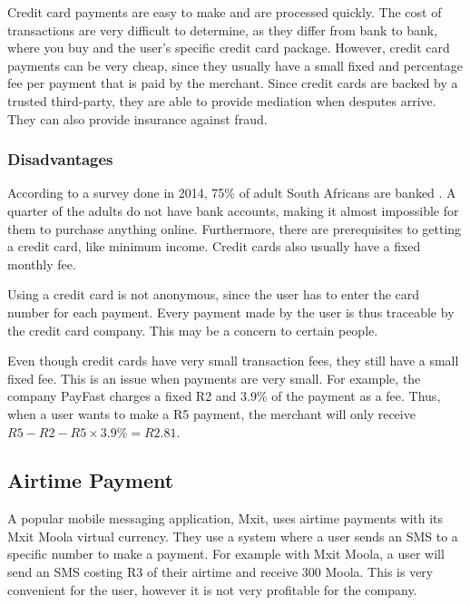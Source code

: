 Credit card payments are easy to make and are processed quickly. The cost of transactions are very difficult to determine, as they differ from bank to bank, where you buy and the user's specific credit card package. However, credit card payments can be very cheap, since they usually have a small fixed and percentage fee per payment that is paid by the merchant. Since credit cards are backed by a trusted third-party, they are able to provide mediation when desputes arrive. They can also provide insurance against fraud. 

\subsubsection{Disadvantages}

According to a survey done in 2014, 75\% of adult South Africans are banked \cite{finmark}. A quarter of the adults do not have bank accounts, making it almost impossible for them to purchase anything online. Furthermore, there are prerequisites to getting a credit card, like minimum income. Credit cards also usually have a fixed monthly fee.

Using a credit card is not anonymous, since the user has to enter the card number for each payment. Every payment made by the user is thus traceable by the credit card company. This may be a concern to certain people.

Even though credit cards have very small transaction fees, they still have a small fixed fee. This is an issue when payments are very small. For example, the company PayFast \cite{PayFast} charges a fixed R2 and 3.9\% of the payment as a fee. Thus, when a user wants to make a R5 payment, the merchant will only receive $R5 - R2 - R5 \times 3.9\% = R2.81$.


\subsection{Airtime Payment}

A popular mobile messaging application, Mxit, uses airtime payments with its Mxit Moola \cite{Mxit} virtual currency. They use a system where a user sends an SMS to a specific number to make a payment. For example with Mxit Moola, a user will send an SMS costing R3 of their airtime and receive 300 Moola. This is very convenient for the user, however it is not very profitable for the company.

